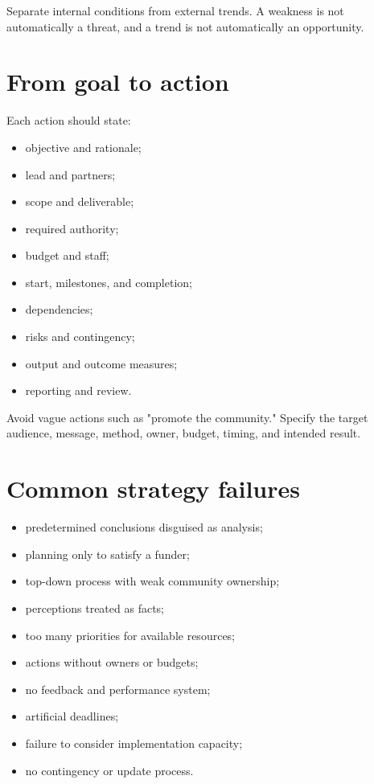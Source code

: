 \documentclass[11pt,letterpaper,oneside,openany]{book}
\begin{document}
Separate internal conditions from external trends. A weakness is not automatically a threat, and a trend is not automatically an opportunity.


\section[From goal to action]{From goal to action}
Each action should state:


\begin{itemize}
\item objective and rationale;
\item lead and partners;
\item scope and deliverable;
\item required authority;
\item budget and staff;
\item start, milestones, and completion;
\item dependencies;
\item risks and contingency;
\item output and outcome measures;
\item reporting and review.
\end{itemize}


Avoid vague actions such as "promote the community." Specify the target audience, message, method, owner, budget, timing, and intended result.


\section[Common strategy failures]{Common strategy failures}
\begin{itemize}
\item predetermined conclusions disguised as analysis;
\item planning only to satisfy a funder;
\item top-down process with weak community ownership;
\item perceptions treated as facts;
\item too many priorities for available resources;
\item actions without owners or budgets;
\item no feedback and performance system;
\item artificial deadlines;
\item failure to consider implementation capacity;
\item no contingency or update process.
\end{itemize}
\end{document}
